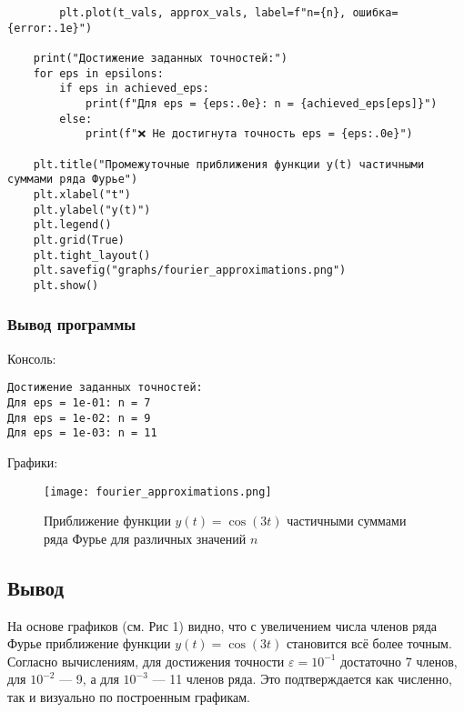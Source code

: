 \documentclass{article}
\begin{document}
\begin{verbatim}
        plt.plot(t_vals, approx_vals, label=f"n={n}, ошибка={error:.1e}")

    print("Достижение заданных точностей:")
    for eps in epsilons:
        if eps in achieved_eps:
            print(f"Для eps = {eps:.0e}: n = {achieved_eps[eps]}")
        else:
            print(f"❌ Не достигнута точность eps = {eps:.0e}")

    plt.title("Промежуточные приближения функции y(t) частичными суммами ряда Фурье")
    plt.xlabel("t")
    plt.ylabel("y(t)")
    plt.legend()
    plt.grid(True)
    plt.tight_layout()
    plt.savefig("graphs/fourier_approximations.png")
    plt.show()
\end{verbatim}

\subsubsection*{Вывод программы}
Консоль:
\begin{verbatim}
Достижение заданных точностей:
Для eps = 1e-01: n = 7
Для eps = 1e-02: n = 9
Для eps = 1e-03: n = 11
\end{verbatim}

Графики:
\begin{figure}[h!]
    \centering
    \texttt{[image: fourier\_approximations.png]}
    \caption{Приближение функции \( y(t) = \cos(3t) \) частичными суммами ряда Фурье для различных значений \( n \)}
    \label{fig:fourier_approximations}
\end{figure}

\subsection*{Вывод}

На основе графиков (см. Рис 1) видно, что с увеличением числа членов ряда Фурье приближение функции \( y(t) = \cos(3t) \) становится всё более точным. Согласно вычислениям, для достижения точности \( \varepsilon = 10^{-1} \) достаточно 7 членов, для \( 10^{-2} \) — 9, а для \( 10^{-3} \) — 11 членов ряда. Это подтверждается как численно, так и визуально по построенным графикам.
\end{document}

